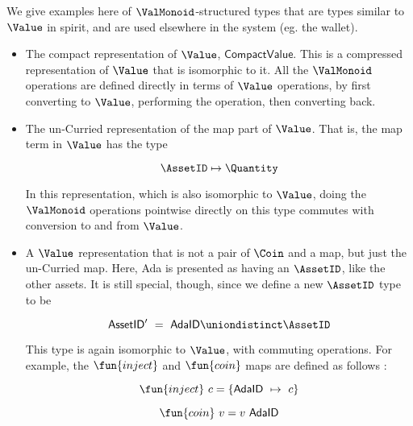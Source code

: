 We give examples here of $\ValMonoid$-structured types
that are types similar to $\Value$ in spirit, and are used elsewhere
in the system (eg. the wallet).

\begin{itemize}
  \item The compact representation of $\Value$, $\mathsf{CompactValue}$. This
  is a compressed representation of $\Value$ that is isomorphic to it.
  All the $\ValMonoid$ operations
  are defined directly in terms of $\Value$ operations, by first converting
  to $\Value$, performing the operation, then converting back.

  \item The un-Curried representation of the map part of $\Value$. That is,
  the map term in $\Value$ has the type

  \[ \AssetID \mapsto \Quantity \]

  In this representation, which is also isomorphic to $\Value$, doing the
  $\ValMonoid$ operations pointwise directly on this type commutes with conversion to
  and from $\Value$.

  \item A $\Value$ representation that is not a pair of $\Coin$ and a map, but just
  the un-Curried map. Here, Ada is presented as having an $\AssetID$,
  like the other assets. It is still special, though, since we define a new
  $\AssetID$ type to be

  \[ \mathsf{AssetID'} ~=~ \mathsf{AdaID} \uniondistinct \AssetID \]

  This type is again isomorphic to $\Value$, with commuting operations. For
  example, the $\fun{inject}$ and $\fun{coin}$ maps are defined as follows :

  \[ \fun{inject}~c = \{ \mathsf{AdaID}~\mapsto~c \} \]

  \[ \fun{coin}~v = v~\mathsf{AdaID} \]
\end{itemize}
